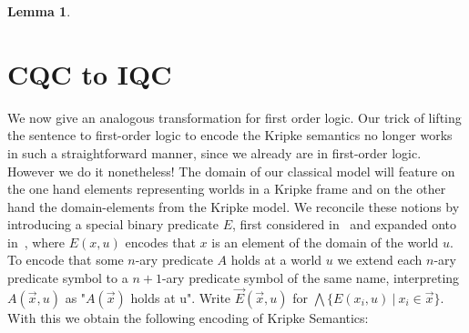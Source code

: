 \documentclass{easychair}
\theoremstyle{definition}
\theoremstyle{definition}
\theoremstyle{definition}
\newtheorem{lemma}[theorem]{Lemma}
\theoremstyle{definition}
\theoremstyle{definition}
\theoremstyle{definition}
\theoremstyle{definition}
\begin{document}
\begin{lemma}
\section{CQC to IQC}

We now give an analogous transformation for first order logic. Our trick of lifting the sentence to first-order logic to encode the Kripke semantics no longer works in such a straightforward manner, since we already are in first-order logic. However we do it nonetheless! The domain of our classical model will feature on the one hand elements representing worlds in a Kripke frame and on the other hand the domain-elements from the Kripke model. We reconcile these notions by introducing a special binary predicate $E$, first considered in~\cite{baaz2006skolemization} and expanded onto in~\cite{iemhoff2010eskolemization}, where $E(x, u)$ encodes that $x$ is an element of the domain of the world $u$. To encode that some $n$-ary predicate $A$ holds at a world $u$ we extend each $n$-ary predicate symbol to a $n+1$-ary predicate symbol of the same name, interpreting $A(\vec x, u)$ as "$A(\vec x)$ holds at u". Write $\vec E(\vec x, u)$ for $\bigwedge\{E(x_i, u)\:|\:x_i\in \vec x\}$. With this we obtain the following encoding of Kripke Semantics:


\end{lemma}
\end{document}
